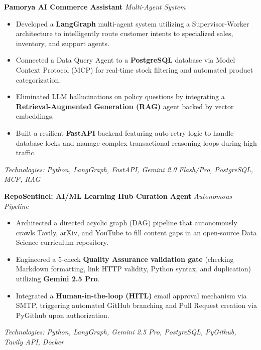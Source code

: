 \documentclass[a4paper,10pt]{article}
\begin{document}
\noindent\textbf{Pamorya AI Commerce Assistant} \hfill \textit{Multi-Agent System}
\begin{itemize}[leftmargin=*, topsep=4pt, itemsep=2pt]
    \item Developed a \textbf{LangGraph} multi-agent system utilizing a Supervisor-Worker architecture to intelligently route customer intents to specialized sales, inventory, and support agents.
    \item Connected a Data Query Agent to a \textbf{PostgreSQL} database via Model Context Protocol (MCP) for real-time stock filtering and automated product categorization.
    \item Eliminated LLM hallucinations on policy questions by integrating a \textbf{Retrieval-Augmented Generation (RAG)} agent backed by vector embeddings.
    \item Built a resilient \textbf{FastAPI} backend featuring auto-retry logic to handle database locks and manage complex transactional reasoning loops during high traffic.
\end{itemize}
\textit{Technologies: Python, LangGraph, FastAPI, Gemini 2.0 Flash/Pro, PostgreSQL, MCP, RAG}
\vspace{8pt}

\noindent\textbf{RepoSentinel: AI/ML Learning Hub Curation Agent} \hfill \textit{Autonomous Pipeline}
\begin{itemize}[leftmargin=*, topsep=4pt, itemsep=2pt]
    \item Architected a directed acyclic graph (DAG) pipeline that autonomously crawls Tavily, arXiv, and YouTube to fill content gaps in an open-source Data Science curriculum repository.
    \item Engineered a 5-check \textbf{Quality Assurance validation gate} (checking Markdown formatting, link HTTP validity, Python syntax, and duplication) utilizing \textbf{Gemini 2.5 Pro}.
    \item Integrated a \textbf{Human-in-the-loop (HITL)} email approval mechanism via SMTP, triggering automated GitHub branching and Pull Request creation via PyGithub upon authorization.
\end{itemize}
\textit{Technologies: Python, LangGraph, Gemini 2.5 Pro, PostgreSQL, PyGithub, Tavily API, Docker}
\vspace{8pt}
\end{document}
